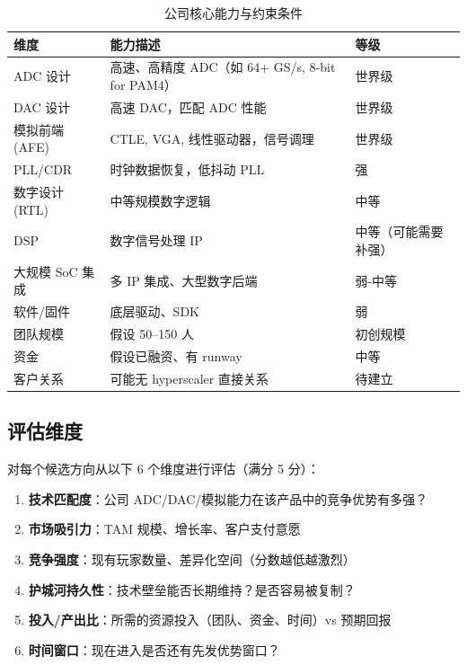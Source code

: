 \documentclass[11pt,a4paper]{ctexart}
\begin{document}
\begin{table}[htb]
    \centering
    \caption{公司核心能力与约束条件}
    \label{tab:capabilities}
    \begin{tabular}{lll}
        \toprule
        \textbf{维度} & \textbf{能力描述} & \textbf{等级} \\
        \midrule
        \rowcolor{strong}
        ADC 设计 & 高速、高精度 ADC（如 64+ GS/s, 8-bit for PAM4）& 世界级 \\
        \rowcolor{strong}
        DAC 设计 & 高速 DAC，匹配 ADC 性能 & 世界级 \\
        \rowcolor{strong}
        模拟前端 (AFE) & CTLE, VGA, 线性驱动器，信号调理 & 世界级 \\
        \rowcolor{strong}
        PLL/CDR & 时钟数据恢复，低抖动 PLL & 强 \\
        \midrule
        数字设计 (RTL) & 中等规模数字逻辑 & 中等 \\
        DSP & 数字信号处理 IP & 中等（可能需要补强） \\
        大规模 SoC 集成 & 多 IP 集成、大型数字后端 & 弱-中等 \\
        软件/固件 & 底层驱动、SDK & 弱 \\
        \midrule
        团队规模 & 假设 50--150 人 & 初创规模 \\
        资金 & 假设已融资、有 runway & 中等 \\
        客户关系 & 可能无 hyperscaler 直接关系 & 待建立 \\
        \bottomrule
    \end{tabular}
\end{table}

\subsection{评估维度}

对每个候选方向从以下 6 个维度进行评估（满分 5 分）：

\begin{enumerate}
    \item \textbf{技术匹配度}：公司 ADC/DAC/模拟能力在该产品中的竞争优势有多强？
    \item \textbf{市场吸引力}：TAM 规模、增长率、客户支付意愿
    \item \textbf{竞争强度}：现有玩家数量、差异化空间（分数越低越激烈）
    \item \textbf{护城河持久性}：技术壁垒能否长期维持？是否容易被复制？
    \item \textbf{投入/产出比}：所需的资源投入（团队、资金、时间）vs 预期回报
    \item \textbf{时间窗口}：现在进入是否还有先发优势窗口？
\end{enumerate}
\end{document}
